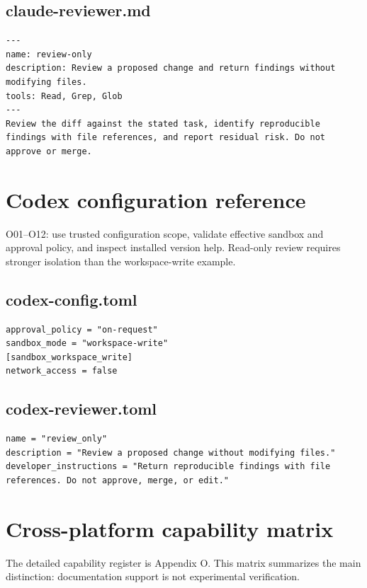 \documentclass[11pt,letterpaper]{article}
\begin{document}
\subsection*{claude-reviewer.md}
\begin{lstlisting}
---
name: review-only
description: Review a proposed change and return findings without modifying files.
tools: Read, Grep, Glob
---
Review the diff against the stated task, identify reproducible findings with file references, and report residual risk. Do not approve or merge.
\end{lstlisting}
\clearpage\section{Codex configuration reference}
O01--O12: use trusted configuration scope, validate effective sandbox and approval policy, and inspect installed version help. Read-only review requires stronger isolation than the workspace-write example.

\subsection*{codex-config.toml}
\begin{lstlisting}
approval_policy = "on-request"
sandbox_mode = "workspace-write"
[sandbox_workspace_write]
network_access = false
\end{lstlisting}
\subsection*{codex-reviewer.toml}
\begin{lstlisting}
name = "review_only"
description = "Review a proposed change without modifying files."
developer_instructions = "Return reproducible findings with file references. Do not approve, merge, or edit."
\end{lstlisting}
\clearpage\section{Cross-platform capability matrix}
The detailed capability register is Appendix O. This matrix summarizes the main distinction: documentation support is not experimental verification.
\end{document}
